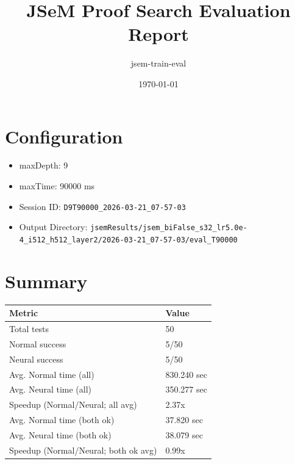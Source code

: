 \documentclass[a4paper,10pt]{article}
\title{JSeM Proof Search Evaluation Report}
\author{jsem-train-eval}
\date{\today}
\begin{document}
\maketitle

\section{Configuration}
\begin{itemize}
\item maxDepth: 9
\item maxTime: 90000 ms
\item Session ID: \texttt{D9T90000\_2026-03-21\_07-57-03}
\item Output Directory: \texttt{jsemResults/jsem\_biFalse\_s32\_lr5.0e-4\_i512\_h512\_layer2/2026-03-21\_07-57-03/eval\_T90000}
\end{itemize}

\section{Summary}
\begin{tabular}{ll}
\toprule
\textbf{Metric} & \textbf{Value} \\
\midrule
Total tests & 50 \\
Normal success & 5/50 \\
Neural success & 5/50 \\
\midrule
Avg. Normal time (all) & 830.240 sec \\
Avg. Neural time (all) & 350.277 sec \\
Speedup (Normal/Neural; all avg) & 2.37x \\
Avg. Normal time (both ok) & 37.820 sec \\
Avg. Neural time (both ok) & 38.079 sec \\
Speedup (Normal/Neural; both ok avg) & 0.99x \\
\bottomrule
\end{tabular}
\end{document}
